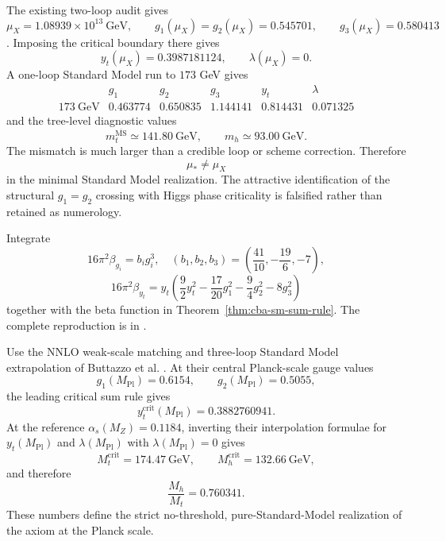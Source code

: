 \begin{proposition}
\label{prop:cba-crossing-killed}
The existing two-loop audit gives
\[
 \mu_X=1.08939\times10^{13}\ \mathrm{GeV},
 \qquad
 g_1(\mu_X)=g_2(\mu_X)=0.545701,
 \qquad
 g_3(\mu_X)=0.580413
\]
\cite{lande-hopf-audit}.  Imposing the critical boundary there gives
\[
 y_t(\mu_X)=0.3987181124,
 \qquad
 \lambda(\mu_X)=0.
\]
A one-loop Standard Model run to $173$ GeV gives
\[
\begin{array}{c|ccccc}
 &g_1&g_2&g_3&y_t&\lambda\\
\hline
173\ \mathrm{GeV}
&0.463774&0.650835&1.144141&0.814431&0.071325
\end{array}
\]
and the tree-level diagnostic values
\[
 m_t^{\overline{\mathrm{MS}}}\simeq141.80\ \mathrm{GeV},
 \qquad
 m_h\simeq93.00\ \mathrm{GeV}.
\]
The mismatch is much larger than a credible loop or scheme correction.  Therefore
\[
 \boxed{\mu_*\ne\mu_X}
\]
in the minimal Standard Model realization.  The attractive identification of the
structural $g_1=g_2$ crossing with Higgs phase criticality is falsified rather than
retained as numerology.
\end{proposition}

\begin{proofsketch}
Integrate
\[
16\pi^2\beta_{g_i}=b_i g_i^3,
\quad
(b_1,b_2,b_3)=\left(\frac{41}{10},-\frac{19}{6},-7\right),
\]
\[
16\pi^2\beta_{y_t}
=y_t\left(\frac92y_t^2-\frac{17}{20}g_1^2-\frac94g_2^2-8g_3^2\right)
\]
together with the beta function in Theorem~\ref{thm:cba-sm-sum-rule}.  The complete
reproduction is in .
\end{proofsketch}

\begin{theorem}
\label{thm:cba-planck-benchmark}
Use the NNLO weak-scale matching and three-loop Standard Model extrapolation of
Buttazzo et al. \cite{buttazzo-criticality}.  At their central Planck-scale gauge
values
\[
 g_1(M_{\mathrm{Pl}})=0.6154,
 \qquad
 g_2(M_{\mathrm{Pl}})=0.5055,
\]
the leading critical sum rule gives
\[
 \boxed{y_t^{\mathrm{crit}}(M_{\mathrm{Pl}})=0.3882760941.}
\]
At the reference $\alpha_s(M_Z)=0.1184$, inverting their interpolation formulae
for $y_t(M_{\mathrm{Pl}})$ and $\lambda(M_{\mathrm{Pl}})$ with
$\lambda(M_{\mathrm{Pl}})=0$ gives
\[
 \boxed{
 M_t^{\mathrm{crit}}=174.47\ \mathrm{GeV},
 \qquad
 M_h^{\mathrm{crit}}=132.66\ \mathrm{GeV},}
\]
and therefore
\[
 \boxed{\frac{M_h}{M_t}=0.760341.}
\]
These numbers define the strict no-threshold, pure-Standard-Model realization of
the axiom at the Planck scale.
\end{theorem}

